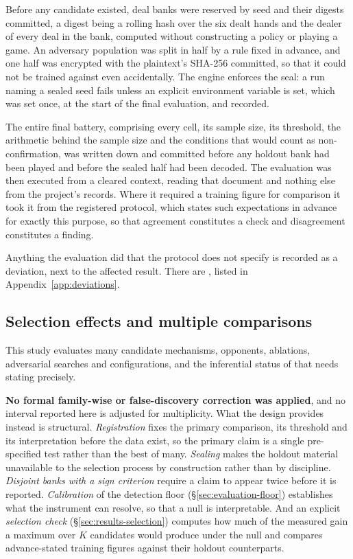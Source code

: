 Before any candidate existed, deal banks were reserved by seed and their digests committed, a digest
being a rolling hash over the six dealt hands and the dealer of every deal in the bank, computed
without constructing a policy or playing a game. An adversary population was split in half by a rule
fixed in advance, and one half was encrypted with the plaintext's SHA-256 committed, so that it could
not be trained against even accidentally. The engine enforces the seal: a run naming a sealed seed
fails unless an explicit environment variable is set, which was set once, at the start of the final
evaluation, and recorded.

The entire final battery, comprising every cell, its sample size, its threshold, the arithmetic
behind the sample size and the conditions that would count as non-confirmation, was written down and
committed before any holdout bank had been played and before the sealed half had been decoded. The
evaluation was then executed from a cleared context, reading that document and nothing else from the
project's records. Where it required a training figure for comparison it took it from the registered
protocol, which states such expectations in advance for exactly this purpose, so that agreement
constitutes a check and disagreement constitutes a finding.

Anything the evaluation did that the protocol does not specify is recorded as a deviation, next to
the affected result. There are \vsevenDeviations{}, listed in Appendix~\ref{app:deviations}.

\subsection{Selection effects and multiple comparisons}
\label{sec:evaluation-multiplicity}

This study evaluates many candidate mechanisms, opponents, ablations, adversarial searches and
configurations, and the inferential status of that needs stating precisely.

\textbf{No formal family-wise or false-discovery correction was applied}, and no interval reported
here is adjusted for multiplicity. What the design provides instead is structural.
\emph{Registration} fixes the primary comparison, its threshold and its interpretation before the
data exist, so the primary claim is a single pre-specified test rather than the best of many.
\emph{Sealing} makes the holdout material unavailable to the selection process by construction rather
than by discipline. \emph{Disjoint banks with a sign criterion} require a claim to appear twice
before it is reported. \emph{Calibration} of the detection floor (\S\ref{sec:evaluation-floor})
establishes what the instrument can resolve, so that a null is interpretable. And an explicit
\emph{selection check} (\S\ref{sec:results-selection}) computes how much of the measured gain a
maximum over $K$ candidates would produce under the null and compares advance-stated training figures
against their holdout counterparts.

